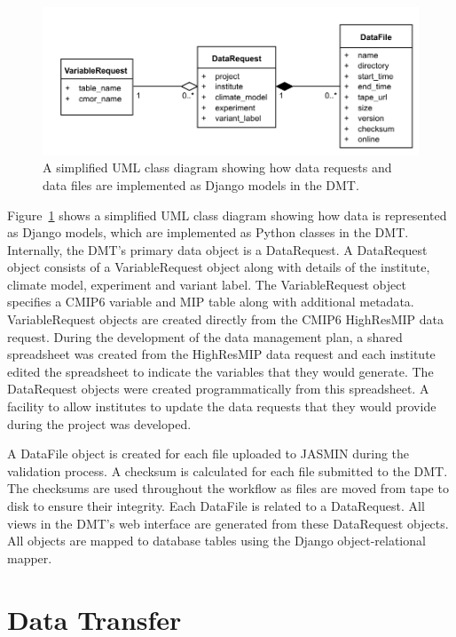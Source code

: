 \documentclass[gmd, manuscript]{copernicus}
\begin{document}
\begin{figure}[t]
	\includegraphics[width=12cm]{fig04.pdf}
	\caption{A simplified UML class diagram showing how data requests and data files are implemented as Django models in the DMT.}
	\label{dmt_struture}
\end{figure}


Figure~\ref{dmt_struture} shows a simplified UML class diagram showing how data is represented as Django models, which are implemented as Python classes in the DMT. Internally, the DMT's primary data object is a DataRequest. A DataRequest object consists of a VariableRequest object along with details of the institute, climate model, experiment and variant label. The VariableRequest object specifies a CMIP6 variable and MIP table along with additional metadata. VariableRequest objects are created directly from the CMIP6 HighResMIP data request. During the development of the data management plan, a shared spreadsheet was created from the HighResMIP data request and each institute edited the spreadsheet to indicate the variables that they would generate. The DataRequest objects were created programmatically from this spreadsheet. A facility to allow institutes to update the data requests that they would provide during the project was developed.

A DataFile object is created for each file uploaded to JASMIN during the validation process. A checksum is calculated for each file submitted to the DMT. The checksums are used throughout the workflow as files are moved from tape to disk to ensure their integrity. Each DataFile is related to a DataRequest. All views in the DMT's web interface are generated from these DataRequest objects. All objects are mapped to database tables using the Django object-relational mapper. 

\section{Data Transfer}
\label{transfer_rates}
\end{document}
